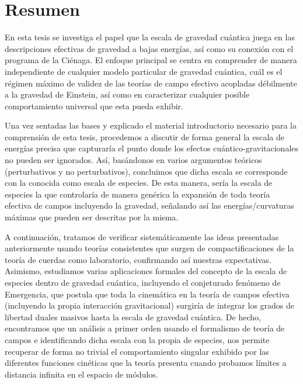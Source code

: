 \newpage
\thispagestyle{empty}

\chapter*{Resumen}
\thispagestyle{empty}

En esta tesis se investiga el papel que la escala de gravedad cuántica juega en las descripciones efectivas de gravedad a bajas energías, así como su conexión con el programa de la Ciénaga. El enfoque principal se centra en comprender de manera independiente de cualquier modelo particular de gravedad cuántica, cuál es el régimen máximo de validez de las teorías de campo efectivo acopladas débilmente a la gravedad de Einstein, así como en caracterizar cualquier posible comportamiento universal que esta pueda exhibir.

Una vez sentadas las bases y explicado el material introductorio necesario para la comprensión de esta tesis, procedemos a discutir de forma general la escala de energías precisa que capturaría el punto donde los efectos cuántico-gravitacionales no pueden ser ignorados. Así, basándonos en varios argumentos teóricos (perturbativos y no perturbativos), concluimos que dicha escala se corresponde con la conocida como escala de especies. De esta manera, sería la escala de especies la que controlaría de manera genérica la expansión de toda teoría efectiva de campos incluyendo la gravedad, señalando así las energías/curvaturas máximas que pueden ser descritas por la misma.

A continuación, tratamos de verificar sistemáticamente las ideas presentadas anteriormente usando teorías consistentes que surgen de compactificaciones de la teoría de cuerdas como laboratorio, confirmando así nuestras expectativas. Asimismo, estudiamos varias aplicaciones formales del concepto de la escala de especies dentro de gravedad cuántica, incluyendo el conjeturado fenómeno de Emergencia, que postula que toda la cinemática en la teoría de campos efectiva (incluyendo la propia interacción gravitacional) surgiría de integrar los grados de libertad duales masivos hasta la escala de gravedad cuántica. De hecho, encontramos que un análisis a primer orden usando el formalismo de teoría de campos e identificando dicha escala con la propia de especies, nos permite recuperar de forma no trivial el comportamiento singular exhibido por las diferentes funciones cinéticas que la teoría presenta cuando probamos límites a distancia infinita en el espacio de módulos.

